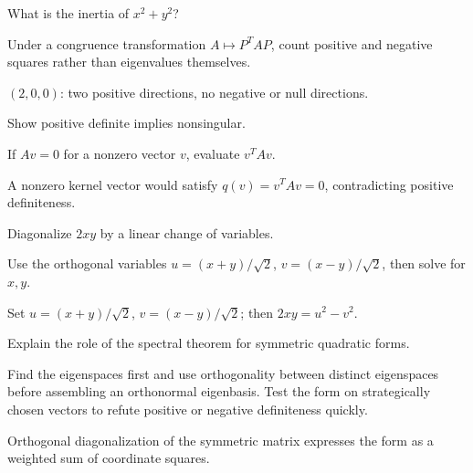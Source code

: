\begin{exercise}\label{exr:i17-05}
What is the inertia of $x^2+y^2$?
\end{exercise}
\begin{hint}
Under a congruence transformation \(A\mapsto P^TAP\), count positive and negative squares rather than eigenvalues themselves.
\end{hint}
\begin{solution}
$(2,0,0)$: two positive directions, no negative or null directions.
\end{solution}

\begin{exercise}\label{exr:i17-06}
Show positive definite implies nonsingular.
\end{exercise}
\begin{hint}
If \(Av=0\) for a nonzero vector \(v\), evaluate \(v^TAv\).
\end{hint}
\begin{solution}
A nonzero kernel vector would satisfy $q(v)=v^TAv=0$, contradicting positive definiteness.
\end{solution}

\begin{exercise}\label{exr:i17-07}
Diagonalize $2xy$ by a linear change of variables.
\end{exercise}
\begin{hint}
Use the orthogonal variables \(u=(x+y)/\sqrt2\), \(v=(x-y)/\sqrt2\), then solve for \(x,y\).
\end{hint}
\begin{solution}
Set $u=(x+y)/\sqrt2$, $v=(x-y)/\sqrt2$; then $2xy=u^2-v^2$.
\end{solution}

\begin{exercise}\label{exr:i17-08}
Explain the role of the spectral theorem for symmetric quadratic forms.
\end{exercise}
\begin{hint}
Find the eigenspaces first and use orthogonality between distinct eigenspaces before assembling an orthonormal eigenbasis. Test the form on strategically chosen vectors to refute positive or negative definiteness quickly.
\end{hint}
\begin{solution}
Orthogonal diagonalization of the symmetric matrix expresses the form as a weighted sum of coordinate squares.
\end{solution}


